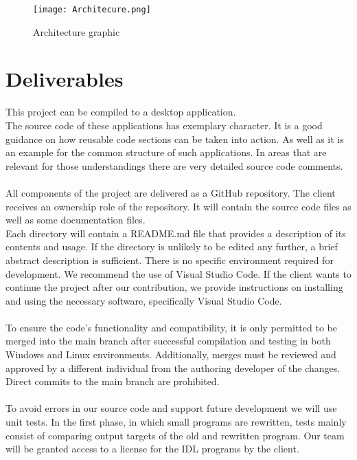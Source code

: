 \documentclass[
	points=true,
 	nenglish,
	colorbacktitle,
	identbarcolor=2b,
	accentcolor=2b
	]{tudaexercise}
\begin{document}
\begin{figure}[h!]
  \texttt{[image: Architecure.png]}
  \caption{Architecture graphic}
  \label{fig:architecture}
\end{figure}

\section{Deliverables}
This project can be compiled to a desktop application.\\
The source code of these applications has exemplary character. It is a good guidance on how reusable code sections can be taken into action. As well as it is an example for the common structure of such applications. In areas that are relevant for those understandings there are very detailed source code comments. \\ \\

All components of the project are delivered as a GitHub repository. The client receives an ownership role of the repository. It will contain the source code files as well as some documentation files. \\
Each directory will contain a README.md file that provides a description of its contents and usage. If the directory is unlikely to be edited any further, a brief abstract description is sufficient.
There is no specific environment required for development.
We recommend the use of Visual Studio Code. If the client wants to continue the project after our contribution, we provide instructions on installing and using the necessary software, specifically Visual Studio Code. \\ \\

To ensure the code's functionality and compatibility, it is only permitted to be merged into the main branch after successful compilation and testing in both Windows and Linux environments. Additionally, merges must be reviewed and approved by a different individual from the authoring developer of the changes. Direct commits to the main branch are prohibited. \\ \\

To avoid errors in our source code and support future development we will use unit tests.
In the first phase, in which small programs are rewritten, tests mainly consist of comparing output targets of the old and rewritten program. Our team will be granted access to a license for the IDL programs by the client. \\ \\
\end{document}
